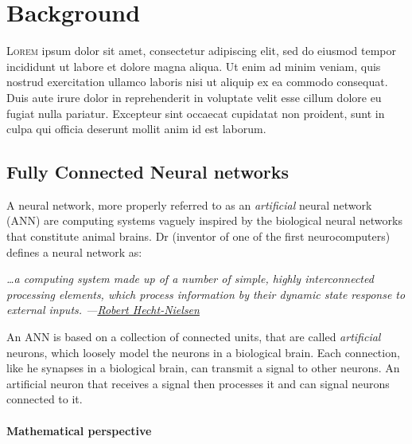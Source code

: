 

\chapter{Background}



\lettrine{L}{orem} ipsum dolor sit amet, consectetur
adipiscing elit, sed do eiusmod tempor incididunt ut labore et dolore magna
aliqua. Ut enim ad minim veniam, quis nostrud exercitation ullamco laboris nisi
ut aliquip ex ea commodo consequat. Duis aute irure dolor in reprehenderit in
voluptate velit esse cillum dolore eu fugiat nulla pariatur. Excepteur sint
occaecat cupidatat non proident, sunt in culpa qui officia deserunt mollit anim
id est laborum.


\section{Fully Connected Neural networks}

A neural network, more properly referred to as an \textit{artificial} neural
network (ANN) are computing systems vaguely inspired by the biological neural
networks that constitute animal brains. Dr
(inventor of one of the first neurocomputers) defines a neural network as:

\begin{quoteBox}
  \itshape
  \ldots a computing system made up of a number of simple, highly interconnected
  processing elements, which process information by their dynamic state response
  to external inputs.
  \tcblower
  \hfill \upshape
  ---\href{https://en.wikipedia.org/wiki/Robert_Hecht-Nielsen}
  {Robert Hecht-Nielsen}
\end{quoteBox}

An ANN is based on a collection of connected units, that are called
\textit{artificial} neurons, which loosely model the neurons in a biological
brain. Each connection, like he synapses in a biological brain, can transmit a
signal to other neurons. An artificial neuron that receives a signal then
processes it and can signal neurons connected to it.


\subsubsection{Mathematical perspective}

